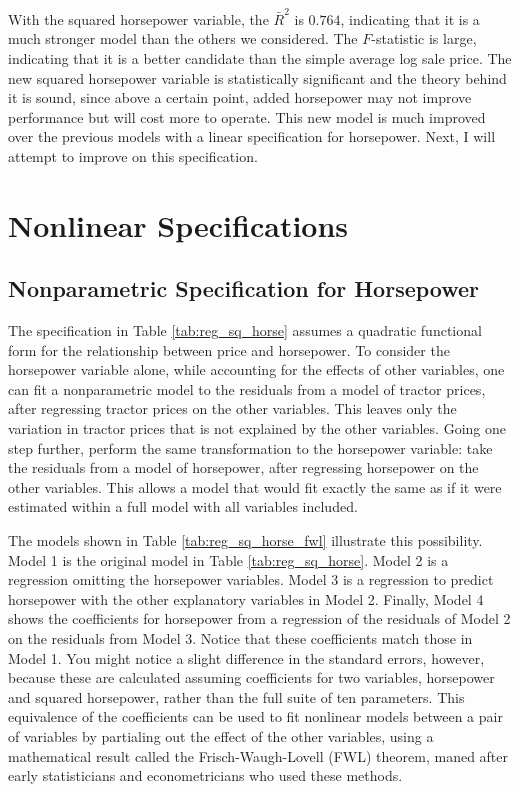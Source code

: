 \documentclass[11pt]{paper}
\begin{document}
With the squared horsepower variable, the $\bar{R}^2$ is $0.764$, indicating that it is a much stronger model than the others we considered. 
The $F$-statistic is large, indicating that it is a better candidate than the simple average log sale price. 
The new squared horsepower variable is statistically significant and the theory behind it is sound, since above a certain point, added horsepower may not improve performance but will cost more to operate. 
This new model is much improved over the previous models with a linear specification for horsepower.
Next, I will attempt to improve on this specification. 





\clearpage
\section{Nonlinear Specifications}


\subsection{Nonparametric Specification for Horsepower}


The specification in 
Table \ref{tab:reg_sq_horse}
assumes a quadratic functional form for
the relationship between price and horsepower. 
To consider the horsepower variable alone, 
while accounting for the effects of other variables, 
one can fit a nonparametric model to the residuals 
from a model of tractor prices, 
after regressing tractor prices on the other variables. 
This leaves only the variation in tractor prices that is not explained by the other variables. 
Going one step further, perform the same transformation to the horsepower variable:
take the residuals from a model of horsepower, 
after regressing horsepower on the other variables. 
This allows a model that would fit exactly the same as if it were estimated within a full model with all variables included. 

The models shown in
Table \ref{tab:reg_sq_horse_fwl}
illustrate this possibility. 
Model 1 is the original model in 
Table \ref{tab:reg_sq_horse}. 
Model 2 is a regression omitting the horsepower variables. 
Model 3 is a regression to predict horsepower with the other explanatory variables in Model 2.
Finally, Model 4 shows the coefficients for horsepower
from a regression of the residuals of Model 2
on the residuals from Model 3. 
Notice that these coefficients match those in Model 1. 
You might notice a slight difference in the standard errors, however, 
because these are calculated assuming coefficients 
for two variables, horsepower and squared horsepower,
rather than the full suite of ten parameters.
This equivalence of the coefficients can be used to fit
nonlinear models between a pair of variables by 
partialing out the effect of the other variables, 
using a mathematical result called the Frisch-Waugh-Lovell (FWL) theorem, 
maned after early statisticians and econometricians who used these methods. 
\end{document}
